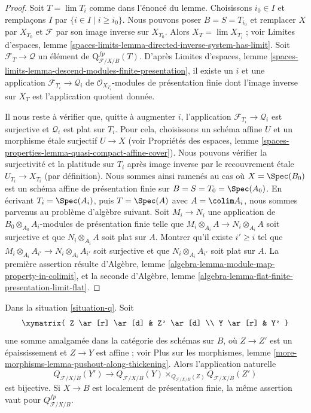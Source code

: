 \begin{proof}
Soit $T = \lim T_i$ comme dans l'énoncé du lemme. Choisissons $i_0 \in I$ et
remplaçons $I$ par $\{i \in I \mid i \geq i_0\}$. Nous pouvons poser
$B = S = T_{i_0}$ et remplacer $X$ par $X_{T_0}$ et $\mathcal{F}$ par son
image inverse sur $X_{T_0}$. Alors $X_T = \lim X_{T_i}$ ; voir Limites
d'espaces, lemme
\ref{spaces-limits-lemma-directed-inverse-system-has-limit}. Soit
$\mathcal{F}_T \to \mathcal{Q}$ un élément de
$\text{Q}^{fp}_{\mathcal{F}/X/B}(T)$. D'après Limites d'espaces, lemme
\ref{spaces-limits-lemma-descend-modules-finite-presentation}, il existe un
$i$ et une application $\mathcal{F}_{T_i} \to \mathcal{Q}_i$ de
$\mathcal{O}_{X_{T_i}}$-modules de présentation finie dont l'image inverse sur
$X_T$ est l'application quotient donnée.

\medskip\noindent
Il nous reste à vérifier que, quitte à augmenter $i$, l'application
$\mathcal{F}_{T_i} \to \mathcal{Q}_i$ est surjective et $\mathcal{Q}_i$ est
plat sur $T_i$. Pour cela, choisissons un schéma affine $U$ et un morphisme
étale surjectif $U \to X$ (voir Propriétés des espaces, lemme
\ref{spaces-properties-lemma-quasi-compact-affine-cover}). Nous pouvons
vérifier la surjectivité et la platitude sur $T_i$ après image inverse par le
recouvrement étale $U_{T_i} \to X_{T_i}$ (par définition). Nous sommes ainsi
ramenés au cas où $X = \Spec(B_0)$ est un schéma affine de présentation finie
sur $B = S = T_0 = \Spec(A_0)$. En écrivant $T_i = \Spec(A_i)$, puis
$T = \Spec(A)$ avec $A = \colim A_i$, nous sommes parvenus au problème
d'algèbre suivant. Soit $M_i \to N_i$ une application de
$B_0 \otimes_{A_0} A_i$-modules de présentation finie telle que
$M_i \otimes_{A_i} A \to N_i \otimes_{A_i} A$ soit surjective et que
$N_i \otimes_{A_i} A$ soit plat sur $A$. Montrer qu'il existe
$i' \geq i$ tel que
$M_i \otimes_{A_i} A_{i'} \to N_i \otimes_{A_i} A_{i'}$ soit surjective et
que $N_i \otimes_{A_i} A_{i'}$ soit plat sur $A$. La première assertion
résulte d'Algèbre, lemme
\ref{algebra-lemma-module-map-property-in-colimit}, et la seconde d'Algèbre,
lemme \ref{algebra-lemma-flat-finite-presentation-limit-flat}.
\end{proof}

\begin{lemma}
\label{lemma-q-RS-star}
Dans la situation \ref{situation-q}. Soit
$$
\xymatrix{
Z \ar[r] \ar[d] & Z' \ar[d] \\
Y \ar[r] & Y'
}
$$
une somme amalgamée dans la catégorie des schémas sur $B$, où
$Z \to Z'$ est un épaississement et $Z \to Y$ est affine ; voir Plus sur les
morphismes, lemme
\ref{more-morphisms-lemma-pushout-along-thickening}. Alors l'application
naturelle
$$
Q_{\mathcal{F}/X/B}(Y') \longrightarrow
Q_{\mathcal{F}/X/B}(Y) \times_{Q_{\mathcal{F}/X/B}(Z)} Q_{\mathcal{F}/X/B}(Z')
$$
est bijective. Si $X \to B$ est localement de présentation finie, la même
assertion vaut pour $Q^{fp}_{\mathcal{F}/X/B}$.
\end{lemma}

